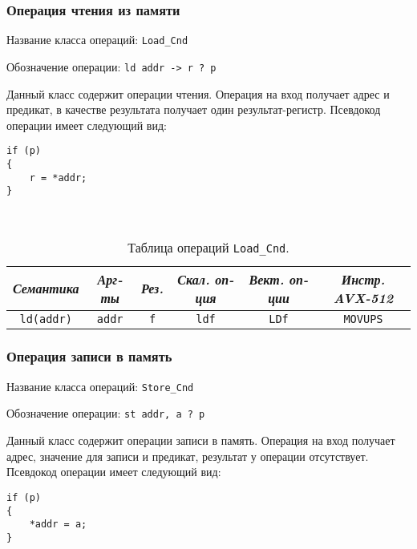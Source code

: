 \documentclass[a4paper,12pt]{extarticle}                     %
\numberwithin{equation}{section}                             %
\numberwithin{figure}{section}                               %
\numberwithin{table}{section}                                %
\theoremstyle{plain}                                         %
\numberwithin{theorem}{section}                              %
\numberwithin{lemma}{section}                                %
\numberwithin{definition}{section}                           %
\begin{document}
\newpage

\subsubsection{Операция чтения из памяти}

Название класса операций: \texttt{Load\_Cnd}

Обозначение операции: \texttt{ld addr -> r ? p}

Данный класс содержит операции чтения. Операция на вход получает адрес и предикат, в качестве результата получает один результат-регистр. Псевдокод операции имеет следующий вид:

\begin{lstlisting}[caption={Псевдокод операции Load\_Cnd.}]
if (p)
{
    r = *addr;
}

\end{lstlisting}

\

\begin{table}[!h]
\setcaptionmargin{0mm}
\onelinecaptionsfalse
{}
\caption{Таблица операций \texttt{Load\_Cnd}.}
\bigskip
\begin{tabular}{|c|c|c|c|c|c|}
\hline
\textit{Семантика} & \textit{Арг-ты} & \textit{Рез.} & \textit{Скал. оп-ция} & \textit{Вект. оп-ции} & \textit{Инстр. AVX-512} \\
\hline
\texttt{ld(addr)} & \texttt{addr} & \texttt{f} & \texttt{ldf} & \texttt{LDf} & \texttt{MOVUPS} \\
\hline
\end{tabular}
\end{table}

\newpage

\subsubsection{Операция записи в память}

Название класса операций: \texttt{Store\_Cnd}

Обозначение операции: \texttt{st addr, a ? p}

Данный класс содержит операции записи в память. Операция на вход получает адрес, значение для записи и предикат, результат у операции отсутствует. Псевдокод операции имеет следующий вид:

\begin{lstlisting}[caption={Псевдокод операции Store\_Cnd.}]
if (p)
{
    *addr = a;
}

\end{lstlisting}
\end{document}
